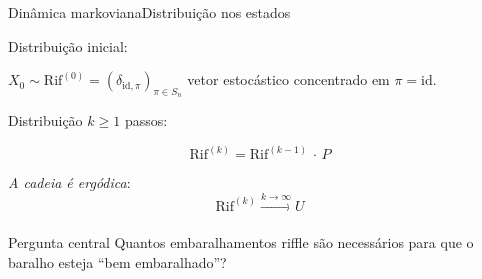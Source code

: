 \documentclass{beamer}
\begin{document}
\begin{frame}[fragile]{Dinâmica markoviana}{Distribuição nos estados}

  \vfill

  Distribuição inicial:
  \begin{center}  
    $X_0\sim\mathrm{Rif}^{(0)} = \left( \delta_{\mathrm{id},\pi}
    \right)_{\pi\in S_n  }$ vetor estocástico concentrado em
    $\pi=\mathrm{id}$.
  \end{center}

  \vfill

  Distribuição $k\ge1$ passos:

$$\mathrm{Rif}^{(k)} = \mathrm{Rif}^{(k-1)} \,\cdot\, P$$
  
  \vfill

  \emph{A cadeia é ergódica}:
  $$
  \mathrm{Rif}^{(k)}
  \xrightarrow[]{k\to \infty} U
  $$
  
  \vfill%

  \begin{block}{Pergunta central}
    Quantos embaralhamentos riffle são necessários para que o baralho
    esteja ``bem embaralhado''?
  \end{block}
  
  \vfill
  

\end{frame}
\end{document}
